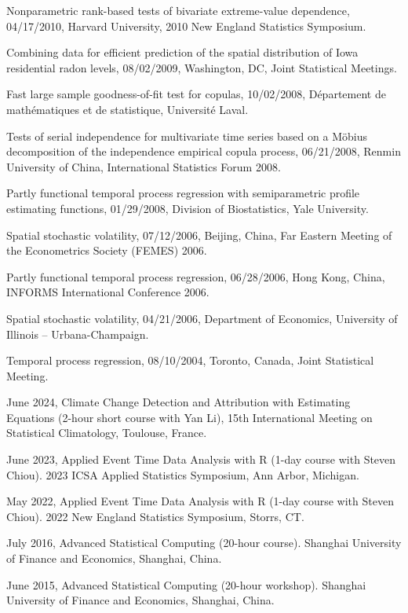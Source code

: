 \documentclass[Statistics]{vita}
\begin{document}
\begin{vita}
\begin{InvitedTalksLectures}
\begin{InvitedTalks}
  \item Nonparametric rank-based tests of bivariate extreme-value dependence, 04/17/2010, Harvard University, 2010 New England Statistics Symposium.
  \item Combining data for efficient prediction of the spatial distribution of Iowa residential radon levels, 08/02/2009, Washington, DC, Joint Statistical Meetings.
  \item Fast large sample goodness-of-fit test for copulas, 10/02/2008, D\'epartement de math\'ematiques et de statistique, Universit\'e Laval.
  \item Tests of serial independence for multivariate time series based on a M\"obius decomposition of the independence empirical copula process, 06/21/2008, Renmin University of China, International Statistics Forum 2008.
  \item Partly functional temporal process regression with semiparametric profile estimating functions, 01/29/2008, Division of Biostatistics, Yale University.
  \item Spatial stochastic volatility, 07/12/2006, Beijing, China, Far Eastern Meeting of the Econometrics Society (FEMES) 2006.
  \item Partly functional temporal process regression, 06/28/2006, Hong Kong, China, INFORMS International Conference 2006.
  \item Spatial stochastic volatility, 04/21/2006, Department of Economics, University of Illinois -- Urbana-Champaign.
  \item Temporal process regression, 08/10/2004, Toronto, Canada, Joint Statistical Meeting.
  \end{InvitedTalks}
  \begin{InvitedWorkshops}
  \item June 2024, Climate Change Detection and Attribution with Estimating Equations (2-hour short course with Yan Li), 15th International Meeting on Statistical Climatology, Toulouse, France.
  \item June 2023, Applied Event Time Data Analysis with R (1-day course with Steven Chiou). 2023 ICSA Applied Statistics Symposium, Ann Arbor, Michigan.
  \item May 2022, Applied Event Time Data Analysis with R (1-day course with Steven Chiou). 2022 New England Statistics Symposium, Storrs, CT.
  \item July 2016, Advanced Statistical Computing (20-hour course). Shanghai University of Finance and Economics, Shanghai, China.
  \item June 2015, Advanced Statistical Computing (20-hour workshop). Shanghai University of Finance and Economics, Shanghai, China.

\end{InvitedWorkshops}
\end{InvitedTalksLectures}
\end{vita}
\end{document}
